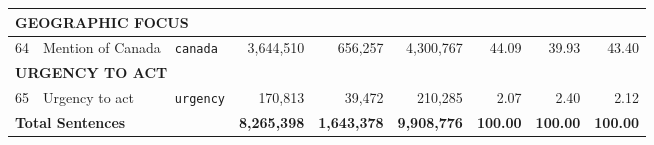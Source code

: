 \begin{longtable}{p{0.5cm}p{4.0cm}p{2.5cm}rrrrrr}
\midrule
\multicolumn{9}{l}{\cellcolor{gray!10}\textbf{GEOGRAPHIC FOCUS}} \\
\midrule
64 & Mention of Canada & \texttt{canada} & 3,644,510 & 656,257 & 4,300,767 & 44.09 & 39.93 & 43.40 \\
\midrule
\multicolumn{9}{l}{\cellcolor{gray!10}\textbf{URGENCY TO ACT}} \\
\midrule
65 & Urgency to act & \texttt{urgency} & 170,813 & 39,472 & 210,285 & 2.07 & 2.40 & 2.12 \\
\bottomrule
\multicolumn{3}{l}{\textbf{Total Sentences}} & \textbf{8,265,398} & \textbf{1,643,378} & \textbf{9,908,776} & \textbf{100.00} & \textbf{100.00} & \textbf{100.00} \\
\bottomrule
\end{longtable}